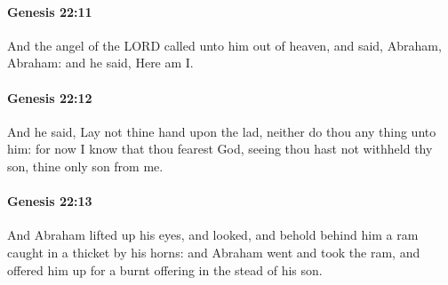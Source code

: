 		\paragraph{Genesis 22:11} %
			\label{GENESIS-22-11}

			And the angel of the LORD called unto him out of heaven, and said, Abraham, Abraham: and he said, Here am I.


		\paragraph{Genesis 22:12} %
			\label{GENESIS-22-12}

			And he said, Lay not thine hand upon the lad, neither do thou any thing unto him: for now I know that thou fearest God, seeing thou hast not withheld thy son, thine only son from me.


		\paragraph{Genesis 22:13} %
			\label{GENESIS-22-13}

			And Abraham lifted up his eyes, and looked, and behold behind him a ram caught in a thicket by his horns: and Abraham went and took the ram, and offered him up for a burnt offering in the stead of his son.


